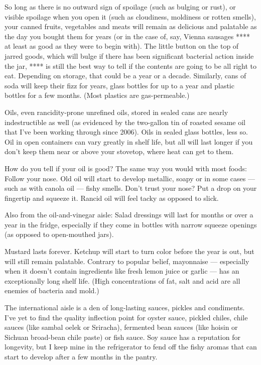 So long as there is no outward sign of spoilage (such as bulging or
rust), or visible spoilage when you open it (such as cloudiness,
moldiness or rotten smells), your canned fruits, vegetables and meats
will remain as delicious and palatable as the day you bought them for
years (or in the case of, say, Vienna sausages **** at least as good as
they were to begin with). The little button on the top of jarred goods,
which will bulge if there has been significant bacterial action inside
the jar, **** is still the best way to tell if the contents are going to
be all right to eat. Depending on storage, that could be a year or a
decade. Similarly, cans of soda will keep their fizz for years, glass
bottles for up to a year and plastic bottles for a few months. (Most
plastics are gas-permeable.)

Oils, even rancidity-prone unrefined oils, stored in sealed cans are
nearly indestructible as well (as evidenced by the two-gallon tin of
roasted sesame oil that I've been working through since 2006). Oils in
sealed glass bottles, less so. Oil in open containers can vary greatly
in shelf life, but all will last longer if you don't keep them near or
above your stovetop, where heat can get to them.

How do you tell if your oil is good? The same way you would with most
foods: Follow your nose. Old oil will start to develop metallic, soapy
or in some cases --- such as with canola oil --- fishy smells. Don't
trust your nose? Put a drop on your fingertip and squeeze it. Rancid oil
will feel tacky as opposed to slick.

Also from the oil-and-vinegar aisle: Salad dressings will last for
months or over a year in the fridge, especially if they come in bottles
with narrow squeeze openings (as opposed to open-mouthed jars).

Mustard lasts forever. Ketchup will start to turn color before the year
is out, but will still remain palatable. Contrary to popular belief,
mayonnaise --- especially when it doesn't contain ingredients like fresh
lemon juice or garlic --- has an exceptionally long shelf life. (High
concentrations of fat, salt and acid are all enemies of bacteria and
mold.)

The international aisle is a den of long-lasting sauces, pickles and
condiments. I've yet to find the quality inflection point for oyster
sauce, pickled chiles, chile sauces (like sambal oelek or Sriracha),
fermented bean sauces (like hoisin or Sichuan broad-bean chile paste) or
fish sauce. Soy sauce has a reputation for longevity, but I keep mine in
the refrigerator to fend off the fishy aromas that can start to develop
after a few months in the pantry.

